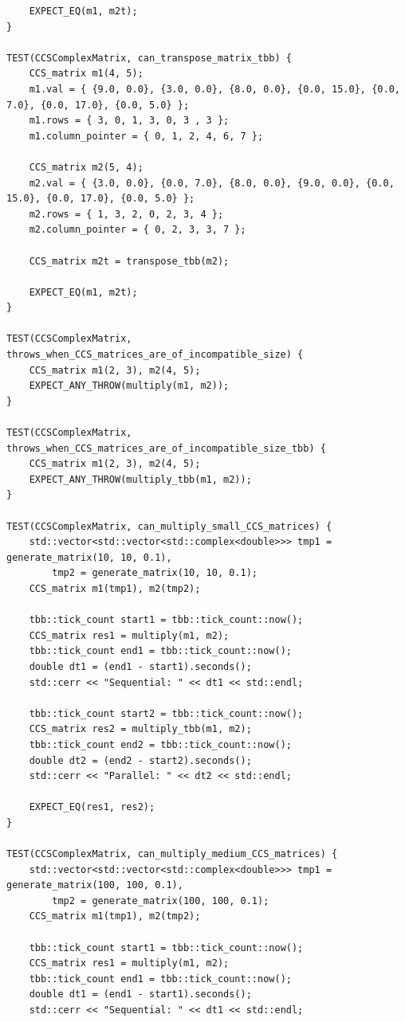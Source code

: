 \documentclass{report}
\begin{document}
\begin{lstlisting}
    EXPECT_EQ(m1, m2t);
}

TEST(CCSComplexMatrix, can_transpose_matrix_tbb) {
    CCS_matrix m1(4, 5);
    m1.val = { {9.0, 0.0}, {3.0, 0.0}, {8.0, 0.0}, {0.0, 15.0}, {0.0, 7.0}, {0.0, 17.0}, {0.0, 5.0} };
    m1.rows = { 3, 0, 1, 3, 0, 3 , 3 };
    m1.column_pointer = { 0, 1, 2, 4, 6, 7 };

    CCS_matrix m2(5, 4);
    m2.val = { {3.0, 0.0}, {0.0, 7.0}, {8.0, 0.0}, {9.0, 0.0}, {0.0, 15.0}, {0.0, 17.0}, {0.0, 5.0} };
    m2.rows = { 1, 3, 2, 0, 2, 3, 4 };
    m2.column_pointer = { 0, 2, 3, 3, 7 };

    CCS_matrix m2t = transpose_tbb(m2);

    EXPECT_EQ(m1, m2t);
}

TEST(CCSComplexMatrix, throws_when_CCS_matrices_are_of_incompatible_size) {
    CCS_matrix m1(2, 3), m2(4, 5);
    EXPECT_ANY_THROW(multiply(m1, m2));
}

TEST(CCSComplexMatrix, throws_when_CCS_matrices_are_of_incompatible_size_tbb) {
    CCS_matrix m1(2, 3), m2(4, 5);
    EXPECT_ANY_THROW(multiply_tbb(m1, m2));
}

TEST(CCSComplexMatrix, can_multiply_small_CCS_matrices) {
    std::vector<std::vector<std::complex<double>>> tmp1 = generate_matrix(10, 10, 0.1),
        tmp2 = generate_matrix(10, 10, 0.1);
    CCS_matrix m1(tmp1), m2(tmp2);

    tbb::tick_count start1 = tbb::tick_count::now();
    CCS_matrix res1 = multiply(m1, m2);
    tbb::tick_count end1 = tbb::tick_count::now();
    double dt1 = (end1 - start1).seconds();
    std::cerr << "Sequential: " << dt1 << std::endl;

    tbb::tick_count start2 = tbb::tick_count::now();
    CCS_matrix res2 = multiply_tbb(m1, m2);
    tbb::tick_count end2 = tbb::tick_count::now();
    double dt2 = (end2 - start2).seconds();
    std::cerr << "Parallel: " << dt2 << std::endl;

    EXPECT_EQ(res1, res2);
}

TEST(CCSComplexMatrix, can_multiply_medium_CCS_matrices) {
    std::vector<std::vector<std::complex<double>>> tmp1 = generate_matrix(100, 100, 0.1),
        tmp2 = generate_matrix(100, 100, 0.1);
    CCS_matrix m1(tmp1), m2(tmp2);

    tbb::tick_count start1 = tbb::tick_count::now();
    CCS_matrix res1 = multiply(m1, m2);
    tbb::tick_count end1 = tbb::tick_count::now();
    double dt1 = (end1 - start1).seconds();
    std::cerr << "Sequential: " << dt1 << std::endl;


\end{lstlisting}
\end{document}
